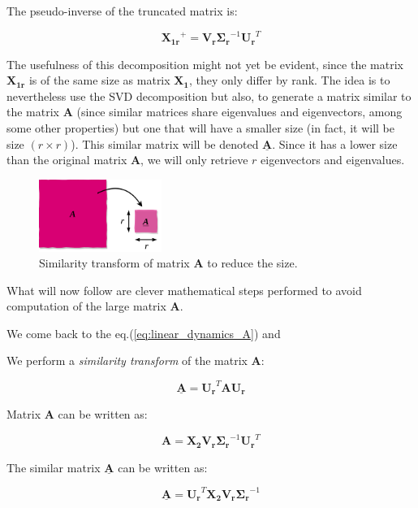 \documentclass[10pt,twocolumn]{article}
\begin{document}
The pseudo-inverse of the truncated matrix is:

\begin{equation} \label{eq:pseudo-inverse}
\bm{X_{1r}}^{+} = \bm{V_r}  \bm{\Sigma_r}^{-1} \bm{U_r}^T
\end{equation}

The usefulness of this decomposition might not yet be evident, since the matrix $\bm{X_{1r}}$ is of the same size as matrix $\bm{X_{1}}$, they only differ by rank. The idea is to nevertheless use the SVD decomposition but also, to generate a matrix similar to the matrix $\bm{A}$ (since similar matrices share eigenvalues and eigenvectors, among some other properties) but one that will have a smaller size (in fact, it will be size $(r \times r)$). This similar matrix will be denoted $\underline{\bm{A}}$. Since it has a lower size than the original matrix $\bm{A}$, we will only retrieve $r$ eigenvectors and eigenvalues.

\begin{figure}
\centering\includegraphics[width=4cm]{similar-matrices.png}
\caption{Similarity transform of matrix $\bm{A}$ to reduce the size.}
\label{fig:similar-matrices}
\end{figure}

What will now follow are clever mathematical steps performed to avoid computation of the large matrix $\bm{A}$.

We come back to the eq.(\ref{eq:linear_dynamics_A}) and

We perform a \textit{similarity transform} of the matrix $\bm{A}$:

\begin{equation} \label{eq:similarity-transform}
\underline{\bm{A}} = \bm{U_r}^T \bm{A} \bm{U_r}
\end{equation}

Matrix $\bm{A}$ can be written as:

\begin{equation} \label{eq:A}
\bm{A} = \bm{X_2} \bm{V_r} \bm{\Sigma_r}^{-1} \bm{U_r}^T
\end{equation}

The similar matrix $\underline{\bm{A}}$ can be written as:

\begin{equation} \label{eq:A_underline}
\underline{\bm{A}} = \bm{U_r}^T \bm{X_2} \bm{V_r} \bm{\Sigma_r}^{-1} 
\end{equation}
\end{document}
